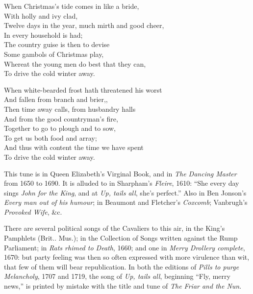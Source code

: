 \begin{dcverse}
\begin{altverse}
When Christmas’s tide comes in like a bride,\\
With holly and ivy clad,\\
Twelve days in the year, much mirth and good cheer, \\
In every household is had;\\
The country guise is then to devise\\
Some gambols of Christmas play,\\
Whereat the young men do best that they can,\\
To drive the cold winter away.
\end{altverse}

\begin{altverse}
When white-bearded frost hath threatened his worst\\
And fallen from branch and brier,,\\
Then time away calls, from husbandry halls\\
And from the good countryman’s fire,\\
Together to go to plough and to sow,\\
To get us both food and array;\\
And thus with content the time we have spent\\
To drive the cold winter away.
\end{altverse}
\end{dcverse}

\pagebreak


This tune is in Queen Elizabeth’s Virginal Book, and in \textit{The Dancing Master}
from 1650 to 1690. It is alluded to in Sharpham’s \textit{Fleire}, 1610: “She every
day sings \textit{John for the King}, and at \textit{Up, tails all}, she’s perfect.” Also in Ben
Jonson’s \textit{Every man out of his humour}; in Beaumont and Fletcher’s \textit{Coxcomb};
Vanbrugh’s \textit{Provoked Wife}, \&c.

There are several political songs of the Cavaliers to this air, in the King’s
Pamphlets (Brit.. Mus.); in the Collection of Songs written against the Rump
Parliament; in \textit{Rats rhimed to Death}, 1660; and one in \textit{Merry Drollery complete},
1670: but party feeling was then so often expressed with more virulence than wit,
that few of them will bear republication. In both the editions of \textit{Pills to purge
Melancholy}, 1707 and 1719, the song of \textit{Up, tails all}, beginning “Fly, merry
news,” is printed by mistake with the title and tune of \textit{The Friar and the Nun}.

